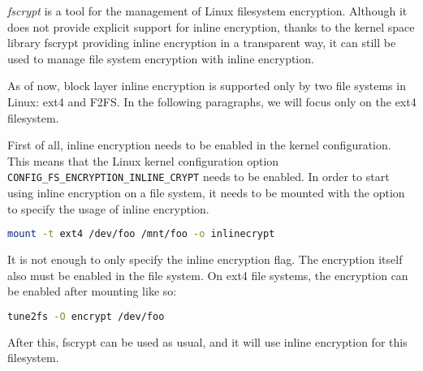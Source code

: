 
\emph{fscrypt} is a tool for the management of Linux filesystem encryption. Although it does not provide explicit support for inline encryption, thanks to the kernel space library fscrypt providing inline encryption in a transparent way, it can still be used to manage file system encryption with inline encryption.


As of now, block layer inline encryption is supported only by two file systems in Linux: ext4 and F2FS. 
In the following paragraphs, we will focus only on the ext4 filesystem.

First of all, inline encryption needs to be enabled in the kernel configuration. This means that the Linux kernel configuration option \verb|CONFIG_FS_ENCRYPTION_INLINE_CRYPT| needs to be enabled.
In order to start using inline encryption on a file system, it needs to be mounted with the option to specify the usage of inline encryption.
\begin{lstlisting}[language=bash]
mount -t ext4 /dev/foo /mnt/foo -o inlinecrypt
\end{lstlisting}
It is not enough to only specify the inline encryption flag. The encryption itself also must be enabled in the file system. On ext4 file systems, the encryption can be enabled after mounting like so:
\begin{lstlisting}[language=bash]
tune2fs -O encrypt /dev/foo
\end{lstlisting}
After this, fscrypt can be used as usual, and it will use inline encryption for this filesystem.



